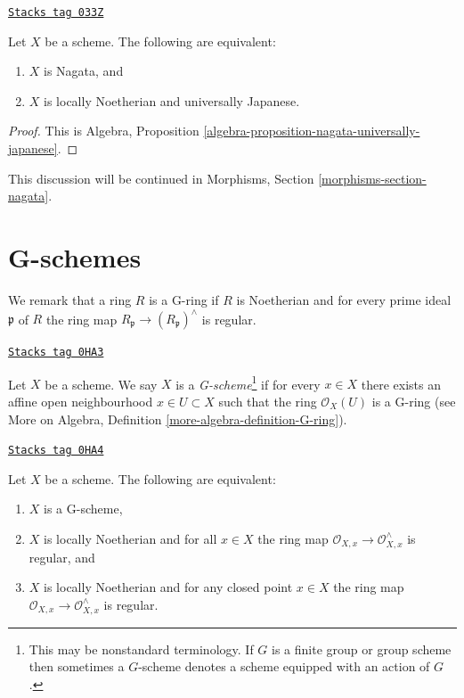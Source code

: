 \begin{lemma}
\label{properties-lemma-nagata-universally-Japanese}
\href{https://stacks.math.columbia.edu/tag/033Z}{\texttt{Stacks tag 033Z}}

Let $X$ be a scheme.
The following are equivalent:
\begin{enumerate}
\item $X$ is Nagata, and
\item $X$ is locally Noetherian and universally Japanese.
\end{enumerate}
\end{lemma}

\begin{proof}
This is
Algebra, Proposition \ref{algebra-proposition-nagata-universally-japanese}.
\end{proof}

This discussion will be continued in
Morphisms, Section \ref{morphisms-section-nagata}.

\section{G-schemes}
\label{properties-section-G-scheme}
We remark that a ring $R$ is a G-ring if $R$ is Noetherian and
for every prime ideal $\mathfrak p$ of $R$ the ring map
$R_\mathfrak p \to (R_\mathfrak p)^\wedge$ is regular.

\begin{definition}[G scheme]
\label{properties-definition-G-scheme}
\href{https://stacks.math.columbia.edu/tag/0HA3}{\texttt{Stacks tag 0HA3}}

Let $X$ be a scheme. We say $X$ is a {\it G-scheme}\footnote{This may be
nonstandard terminology. If $G$ is a finite group or group scheme
then sometimes a $G$-scheme denotes a scheme equipped with an
action of $G$.} if for every $x \in X$ there exists an affine
open neighbourhood $x \in U \subset X$ such that the ring
$\mathcal{O}_X(U)$ is a G-ring (see
More on Algebra, Definition \ref{more-algebra-definition-G-ring}).
\end{definition}

\begin{lemma}
\label{properties-lemma-characterize-G-scheme}
\href{https://stacks.math.columbia.edu/tag/0HA4}{\texttt{Stacks tag 0HA4}}

Let $X$ be a scheme. The following are equivalent:
\begin{enumerate}
\item $X$ is a G-scheme,
\item $X$ is locally Noetherian and for all $x \in X$ the ring
map $\mathcal{O}_{X, x} \to \mathcal{O}_{X, x}^\wedge$ is regular, and
\item $X$ is locally Noetherian and for any closed point $x \in X$
the ring map $\mathcal{O}_{X, x} \to \mathcal{O}_{X, x}^\wedge$ is regular.
\end{enumerate}
\end{lemma}

